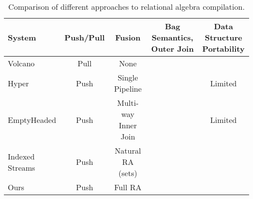\documentclass[acmsmall,screen,nonacm]{acmart}\settopmatter{printfolios=true,printccs=false,printacmref=false}
\newcommand*{\tabyes}{\Pisymbol{pzd}{51}}
\newcommand*{\tabno}{\Pisymbol{pzd}{55}}
\begin{document}
\begin{table}[tbp]
    \centering
    \scriptsize
    \caption{Comparison of different approaches to relational algebra compilation.}
    \vspace{-1em}
    \begin{tabular}{lcccc}\toprule
        System & Push/Pull & Fusion & \shortstack{Bag Semantics, \\ Outer Join} & \shortstack{Data Structure \\ Portability} \\\midrule
        Volcano & Pull & None & \tabyes & \tabyes \\
        Hyper & Push & Single Pipeline & \tabyes & Limited \\
        EmptyHeaded & Push & Multi-way Inner Join & \tabyes & Limited \\
        Indexed Streams & Push & Natural RA (sets) & \tabno & \tabyes \\
        Ours & Push & Full RA & \tabyes & \tabyes
    \\\bottomrule
    \end{tabular}
    \label{tab:comparison}
\end{table}
\end{document}
